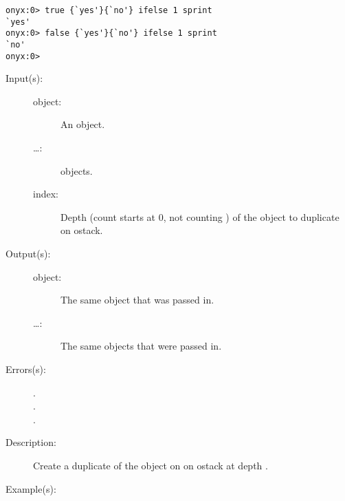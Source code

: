 \begin{description}
\begin{description}
\begin{verbatim}
onyx:0> true {`yes'}{`no'} ifelse 1 sprint
`yes'
onyx:0> false {`yes'}{`no'} ifelse 1 sprint
`no'
onyx:0>
		\end{verbatim}
	\end{description}
\label{systemdict:index}
\item[{\onyxop{object \dots index}{index}{object \dots object}}: ]
	\begin{description}\item[]
	\item[Input(s): ]
		\begin{description}\item[]
		\item[object: ]
			An object.
		\item[\dots: ]
			 objects.
		\item[index: ]
			Depth (count starts at 0, not counting ) of
			the object to duplicate on ostack.
		\end{description}
	\item[Output(s): ]
		\begin{description}\item[]
		\item[object: ]
			The same object that was passed in.
		\item[\dots: ]
			The same  objects that were passed in.
		\end{description}
	\item[Errors(s): ]
		\begin{description}\item[]
		\item[.]
		\item[.]
		\item[.]
		\end{description}
	\item[Description: ]
		Create a duplicate of the object on on ostack at depth
		.
	\item[Example(s): ]\begin{verbatim}


\end{verbatim}
\end{description}
\end{description}

